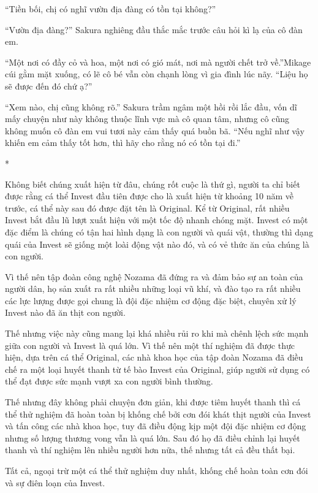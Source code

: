 {``Tiền bối, chị có nghĩ vườn địa đàng có tồn tại không?''

``Vườn địa đàng?'' Sakura nghiêng đầu thắc mắc trước câu hỏi kì lạ của
cô đàn em.

``Một nơi có đầy cỏ và hoa, một nơi có gió mát, nơi mà người chết trở
về.''Mikage cúi gằm mặt xuống, có lẽ cô bé vẫn còn chạnh lòng vì gia
đình lúc nãy. ``Liệu họ sẽ được đến đó chứ ạ?''

``Xem nào, chị cũng không rõ.'' Sakura trầm ngâm một hồi rồi lắc đầu,
vốn dĩ mấy chuyện như này không thuộc lĩnh vực mà cô quan tâm, nhưng cô
cũng không muốn cô đàn em vui tươi này cảm thấy quá buồn bã. ``Nếu nghĩ
như vậy khiến em cảm thấy tốt hơn, thì hãy cho rằng nó có tồn tại đi.''

*

Không biết chúng xuất hiện từ đâu, chúng rốt cuộc là thứ gì, người ta
chỉ biết được rằng cá thể Invest đầu tiên được cho là xuất hiện từ
khoảng 10 năm về trước, cá thể này sau đó được đặt tên là Original. Kể
từ Original, rất nhiều Invest bắt đầu lũ lượt xuất hiện với một tốc độ
nhanh chóng mặt. Invest có một đặc điểm là chúng có tận hai hình dạng là
con người và quái vật, thường thì dạng quái của Invest sẽ giống một loài
động vật nào đó, và có vẻ thức ăn của chúng là con người.

Vì thế nên tập đoàn công nghệ Nozama đã đứng ra và đảm bảo sự an toàn
của người dân, họ sản xuất ra rất nhiều những loại vũ khí, và đào tạo ra
rất nhiều các lực lượng được gọi chung là đội đặc nhiệm cơ động đặc
biệt, chuyên xử lý Invest nào đã ăn thịt con người.

Thế nhưng việc này cũng mang lại khá nhiều rủi ro khi mà chênh lệch sức
mạnh giữa con người và Invest là quá lớn. Vì thế nên một thí nghiệm đã
được thực hiện, dựa trên cá thể Original, các nhà khoa học của tập đoàn
Nozama đã điều chế ra một loại huyết thanh từ tế bào Invest của
Original, giúp người sử dụng có thể đạt được sức mạnh vượt xa con người
bình thường.

Thế nhưng đây không phải chuyện đơn giản, khi được tiêm huyết thanh thì
cá thể thử nghiệm đã hoàn toàn bị khống chế bởi cơn đói khát thịt người
của Invest và tấn công các nhà khoa học, tuy đã điều động kịp một đội
đặc nhiệm cơ động nhưng số lượng thương vong vẫn là quá lớn. Sau đó họ
đã điều chỉnh lại huyết thanh và thí nghiệm lên nhiều người hơn nữa, thế
nhưng tất cả đều thất bại.

Tất cả, ngoại trừ một cá thể thử nghiệm duy nhất, khống chế hoàn toàn
cơn đói và sự điên loạn của Invest.

}
